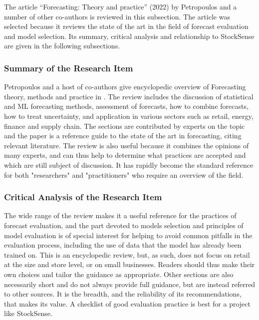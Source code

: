 \documentclass{StockSense}
\begin{document}
The article “Forecasting: Theory and practice” (2022) by Petropoulos and a number of other co-authors is reviewed in this subsection. The article was selected because it reviews the state of the art in the field of forecast evaluation and model selection. Its summary, critical analysis and relationship to StockSense are given in the following subsections.

\subsubsection{Summary of the Research Item}

Petropoulos and a host of co-authors give encyclopedic overview of Forecasting theory, methods and practice in \cite{petropoulos2022forecasting}. The review includes the discussion of statistical and ML forecasting methods, assessment of forecasts, how to combine forecasts, how to treat uncertainty, and application in various sectors such as retail, energy, finance and supply chain. The sections are contributed by experts on the topic and the paper is a reference guide to the state of the art in forecasting, citing relevant literature. The review is also useful because it combines the opinions of many experts, and can thus help to determine what practices are accepted and which are still subject of discussion. It has rapidly become the standard reference for both "researchers" and "practitioners" who require an overview of the field.

\subsubsection{Critical Analysis of the Research Item}

The wide range of the review makes it a useful reference for the practices of forecast evaluation, and the part devoted to models selection and principles of model evaluation is of special interest for helping to avoid common pitfalls in the evaluation process, including the use of data that the model has already been trained on. This is an encyclopedic review, but, as such, does not focus on retail at the size and store level, or on small businesses. Readers should thus make their own choices and tailor the guidance as appropriate. Other sections are also necessarily short and do not always provide full guidance, but are instead referred to other sources. It is the breadth, and the reliability of its recommendations, that makes its value. A checklist of good evaluation practice is best for a project like StockSense.
\end{document}
